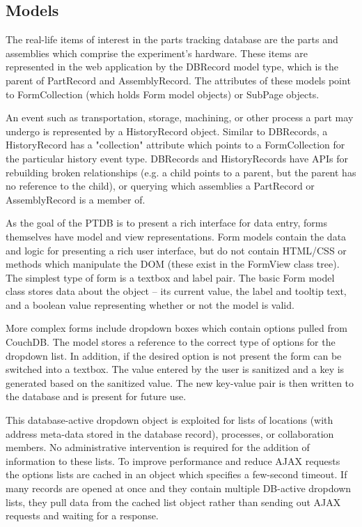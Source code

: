 \documentclass[journal]{IEEEtran}
\begin{document}
\subsection{Models}
The real-life items of interest in the parts tracking database are the parts and assemblies which comprise
the experiment's hardware. These items are represented in the web application by the DBRecord model type, which is
the parent of PartRecord and AssemblyRecord. The attributes of these models point to FormCollection (which holds
Form model objects) or SubPage objects.

An event such as transportation, storage, machining, or other process a part may undergo is represented by a 
HistoryRecord object. Similar to DBRecords, a HistoryRecord has a "collection" attribute which points to a
FormCollection for the particular history event type. DBRecords and HistoryRecords have APIs for rebuilding
broken relationships (e.g. a child points to a parent, but the parent has no reference to the child), or querying
which assemblies a PartRecord or AssemblyRecord is a member of.

As the goal of the PTDB is to present a rich interface for data entry, forms
themselves have model and view representations. 
Form models contain the data and logic for presenting a rich user interface, but do not contain HTML/CSS or
methods which manipulate the DOM (these exist in the FormView class tree).
The simplest type of form is a textbox and label pair. The basic Form model class stores data 
about the object -- its current value, the label and tooltip text,
and a boolean value representing whether or not the model is valid.

More complex forms include dropdown boxes which contain options pulled from CouchDB. The model
stores a reference to the correct type of options for the dropdown list. In addition, if the 
desired option is not present the form can be switched into a textbox. The value entered by
the user is sanitized and a key is generated based on the sanitized value. The new key-value
pair is then written to the database and is present for future use.

This database-active dropdown object is exploited for lists of locations (with address meta-data
stored in the database record), processes, or collaboration members. No administrative intervention
is required for the addition of information to these lists. To improve performance and reduce
AJAX requests the options lists are cached in an object which specifies a few-second timeout.
If many records are opened at once and they contain multiple DB-active dropdown lists, they 
pull data from the cached list object rather than sending out AJAX requests and waiting for 
a response.
\end{document}
